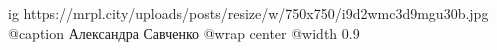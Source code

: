  
 
 
 
 

\ifcmt
  ig https://mrpl.city/uploads/posts/resize/w/750x750/i9d2wmc3d9mgu30b.jpg
	@caption Александра Савченко
  @wrap center
  @width 0.9
\fi
